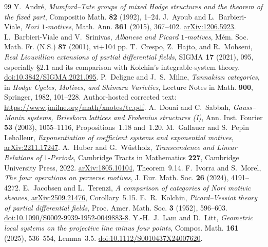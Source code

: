 \documentclass[11pt]{article}
\numberwithin{equation}{section}
\theoremstyle{definition}
\theoremstyle{remark}
\begin{document}
\small
\begin{thebibliography}{99}
Y.~Andr\'e, \emph{Mumford--Tate groups of mixed Hodge structures and the
theorem of the fixed part}, Compositio Math. \textbf{82} (1992), 1--24.
J.~Ayoub and L.~Barbieri-Viale, \emph{Nori $1$-motives}, Math. Ann.
\textbf{361} (2015), 367--402. \href{https://arxiv.org/abs/1206.5923}{arXiv:1206.5923}.
L.~Barbieri-Viale and V.~Srinivas, \emph{Albanese and Picard $1$-motives},
M\'em. Soc. Math. Fr. (N.S.) \textbf{87} (2001), vi+104 pp.
T.~Crespo, Z.~Hajto, and R.~Mohseni, \emph{Real Liouvillian extensions of
partial differential fields}, SIGMA \textbf{17} (2021), 095, especially
\S2.1 and its comparison with Kolchin's integrable-system theory.
\href{https://doi.org/10.3842/SIGMA.2021.095}{doi:10.3842/SIGMA.2021.095}.
P.~Deligne and J.~S.~Milne, \emph{Tannakian categories}, in
\emph{Hodge Cycles, Motives, and Shimura Varieties}, Lecture Notes in Math.
\textbf{900}, Springer, 1982, 101--228. Author-hosted corrected text:
\url{https://www.jmilne.org/math/xnotes/tc.pdf}.
A.~Douai and C.~Sabbah, \emph{Gauss--Manin systems, Brieskorn lattices
and Frobenius structures (I)}, Ann. Inst. Fourier \textbf{53} (2003),
1055--1116, Propositions~1.18 and~1.20.
M.~Gallauer and S.~Pepin Lehalleur, \emph{Exponentiation of coefficient
systems and exponential motives}, \href{https://arxiv.org/abs/2211.17247}{arXiv:2211.17247}.
A.~Huber and G.~W\"ustholz, \emph{Transcendence and Linear Relations of
$1$-Periods}, Cambridge Tracts in Mathematics \textbf{227}, Cambridge
University Press, 2022. \href{https://arxiv.org/abs/1805.10104}{arXiv:1805.10104},
Theorem~9.14.
F.~Ivorra and S.~Morel, \emph{The four operations on perverse motives},
J. Eur. Math. Soc. \textbf{26} (2024), 4191--4272.
E.~Jacobsen and L.~Terenzi, \emph{A comparison of categories of Nori
motivic sheaves}, \href{https://arxiv.org/abs/2509.21476}{arXiv:2509.21476},
Corollary~5.15.
E.~R.~Kolchin, \emph{Picard--Vessiot theory of partial differential fields},
Proc. Amer. Math. Soc. \textbf{3} (1952), 596--603.
\href{https://doi.org/10.1090/S0002-9939-1952-0049883-8}{doi:10.1090/S0002-9939-1952-0049883-8}.
Y.-H.~J.~Lam and D.~Litt, \emph{Geometric local systems on the projective
line minus four points}, Compos. Math. \textbf{161} (2025), 536--554,
Lemma~3.5. \href{https://doi.org/10.1112/S0010437X24007620}{doi:10.1112/S0010437X24007620}.

\end{thebibliography}
\end{document}
